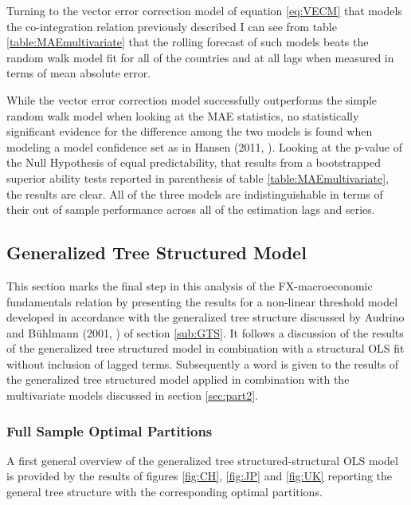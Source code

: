 Turning to the vector error correction model of equation \ref{eq:VECM}
that models the co-integration relation previously described I can see
from table \ref{table:MAEmultivariate} that the rolling forecast of
such models beats the random walk model fit for all of the countries
and at all lags when measured in terms of mean absolute error.

While the vector error correction model successfully outperforms the
simple random walk model when looking at the MAE statistics, no
statistically significant evidence for the difference among the two
models is found when modeling a model confidence set as in Hansen
(2011, \cite{HansenMCS}). Looking at the p-value of the Null
Hypothesis of equal predictability, that results from a bootstrapped
superior ability tests reported in parenthesis of table
\ref{table:MAEmultivariate}, the results are clear. All of the three
models are indistinguishable in terms of their out of sample
performance across all of the estimation lags and series.

\subsection{Generalized Tree Structured Model}

This section marks the final step in this analysis of the
FX-macroeconomic fundamentals relation by presenting the results for a
non-linear threshold model developed in accordance with the
generalized tree structure discussed by Audrino and B{\"u}hlmann
(2001, \cite{AudrinoBuhlmann}) of section
\ref{sub:GTS}. It follows a discussion of the results of the
generalized tree structured model in combination with a structural OLS
fit without inclusion of lagged terms. Subsequently a word is
given to the results of the generalized tree structured model applied
in combination with the multivariate models discussed in section
\ref{sec:part2}.

\subsubsection{Full Sample Optimal Partitions}

A first general overview of the generalized tree structured-structural
OLS model is provided by the results of figures \ref{fig:CH},
\ref{fig:JP} and \ref{fig:UK} reporting the general tree structure
with the corresponding optimal partitions. 

